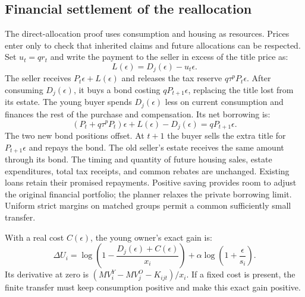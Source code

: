 \subsection{Financial settlement of the reallocation}
\label{app:amend_settlement}

The direct-allocation proof uses consumption and housing as resources.
Prices enter only to check that inherited claims and future allocations can
be respected. Set $u_t=q r_t$ and write the payment to the seller in excess
of the title price as:
\begin{equation}
 L(\epsilon)=D_j(\epsilon)-u_t\epsilon.
 \label{eq:amend_compensation}
\end{equation}
The seller receives $P_t\epsilon+L(\epsilon)$ and releases the tax reserve
$q\tau^pP_t\epsilon$. After consuming $D_j(\epsilon)$, it buys a bond
costing $qP_{t+1}\epsilon$, replacing the title lost from its estate.
The young buyer spends $D_j(\epsilon)$ less on current consumption and
finances the rest of the purchase and compensation. Its net borrowing is:
\begin{equation}
 (P_t+q\tau^pP_t)\epsilon+L(\epsilon)-D_j(\epsilon)
 =qP_{t+1}\epsilon.
 \label{eq:amend_settlement}
\end{equation}
The two new bond positions offset. At $t+1$ the buyer sells the extra title
for $P_{t+1}\epsilon$ and repays the bond. The old seller's estate receives
the same amount through its bond. The timing and quantity of future housing
sales, estate expenditures, total tax receipts, and common rebates are unchanged.
Existing loans retain their promised repayments. Positive saving provides
room to adjust the original financial portfolio; the planner relaxes the
private borrowing limit. Uniform strict margins on matched groups permit
a common sufficiently small transfer.

With a real cost $C(\epsilon)$, the young owner's exact gain is:
\begin{equation}
 \Delta U_i=
 \log\!\left(1-\frac{D_j(\epsilon)+C(\epsilon)}{x_i}\right)
 +\alpha\log\!\left(1+\frac{\epsilon}{s_i}\right).
 \label{eq:amend_exact_gain}
\end{equation}
Its derivative at zero is $(MV_i^Y-MV_j^O-K_{ijt})/x_i$.
If a fixed cost is present, the finite transfer must keep consumption
positive and make this exact gain positive.

